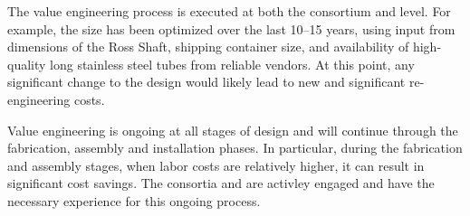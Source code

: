 The value engineering process is executed at both the consortium and
 level. For example, the  size has been optimized
over the last 10--15 years, using input from dimensions of the Ross
Shaft, shipping container size, and availability of high-quality long
stainless steel tubes from reliable vendors.  At this point, any
significant change to the  design would likely lead to new
and significant re-engineering costs.

Value engineering is ongoing at all stages of design and will continue
through the fabrication, assembly and installation phases. In
particular, during the fabrication and assembly stages, when labor costs
are relatively higher, it can result in significant cost savings. The
consortia and  are activley engaged and have the necessary
experience for this ongoing process.

